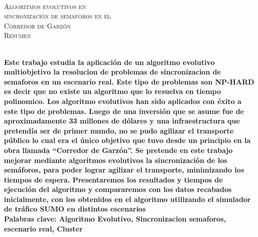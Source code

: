 {
    \thispagestyle{empty}
    ~\\[0.2cm]
    \begin{center}
        \textsc{\huge Algoritmos evolutivos en  } \\[0.2cm] 
        \textsc{\huge sincronización de semaforos en el  } \\[0.2cm]         
        \textsc{\huge Corredor de Garzón} \\[1cm]
        \textsc{\Large Resumen}
    \end{center}
    ~\\[0.2cm]
    \textbf{\large Este trabajo estudia la aplicación de un algoritmo evolutivo multiobjetivo  la resolucion de problemas de sincronizacion de semaforos en un escenario real. Este tipo de problemas son NP-HARD es decir que no existe un algoritmo que lo resuelva en tiempo polinomico. Los algoritmo evolutivos han sido aplicados con éxito a este tipo de problemas.   
   	Luego  de  una  inversión  que  se  asume  fue  de
   	aproximadamente  33  millones  de  dólares  y  una  infraestructura
   	que  pretendía  ser  de  primer  mundo,  no  se  pudo  agilizar  el
   	transporte público lo cual era el único objetivo que tuvo desde un
   	principio en la obra llamada “Corredor de Garzón”. Se pretende
   	en  este  trabajo  mejorar  mediante  algoritmos  evolutivos  la
   	sincronización  de  los  semáforos,  para  poder  lograr  agilizar  el
   	transporte, minimizando los tiempos de espera.
   	Presentaremos  los  resultados  y  tiempos  de  ejecución  del
   	algoritmo y compararemos con los datos recabados inicialmente,
   	con  los  obtenidos  en  el  algoritmo  utilizando  el  simulador  de
   	tráfico  SUMO  en  distintos  escenarios} 	
	~\\[1.0cm]
    \textbf{\large Palabras clave: Algoritmo Evolutivo, Sincronizacion semaforos, escenario real, Cluster}

}
\cleardoublepage
